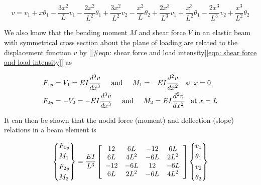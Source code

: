 \documentclass[a4paper,openany,12pt]{book}
\begin{document}
{{$$v = v_1 + x\theta_1 - \frac{3x^2}{L}v_1 - \frac{2x^2}{L^2}\theta_1 + \frac{3x^2}{L^2}v_2 - \frac{x^2}{L}\theta_2 + \frac{2x^3}{L^3}v_1 + \frac{x^3}{L^2}\theta_1 - \frac{2x^3}{L^3}v_2 + \frac{x^3}{L^2}\theta_2$$

We also know that the bending moment \(M\) and shear force \(V\) in an
elastic beam with symmetrical cross section about the plane of loading
are related to the displacement function \(v\) by
[[\#eqn: shear force and load intensity]\ref{eqn: shear force and load intensity}]
as

$$\begin{gathered}
  F_{1y} = V_1 = EI\frac{d^3v}{dx^3} \hspace{0.5cm} \text{and} \hspace{0.5cm}
  M_1 =  -EI\frac{d^2v}{dx^2} \hspace{0.2cm} \text{ at }x = 0 \hfill \\
  F_{2y} =  -V_2 =  - EI\frac{d^3v}{dx^3} \hspace{0.5cm} \text{and}
  \hspace{0.5cm} M_2 = EI\frac{d^2v}{dx^2} \hspace{0.2cm} \text{ at }x = L \hfill \\ \end{gathered}$$

It can then be shown that the nodal force (moment) and deflection
(slope) relations in a beam element is

\begin{gather*}
  \left\{ \begin{gathered}
      F_{1y} \hfill \\
      M_1 \hfill \\
      F_{2y} \hfill \\
      M_2 \hfill \\ 
    \end{gathered}
  \right\} = \frac{EI}{L^3}
  \left[
    \begin{array}{*{20}{c}}
      12&6L&-12&6L \\ 
      6L&4L^2&-6L&2L^2 \\ 
      -12&-6L&12&-6L \\ 
      6L&2L^2&-6L&4L^2 
    \end{array}
  \right]
  \left\{
    \begin{gathered}
      v_1 \hfill \\
      \theta _1 \hfill \\
      v_2 \hfill \\
      \theta _2 \hfill \\ 
    \end{gathered}
  \right\}
\end{gather*}

}}
\end{document}

